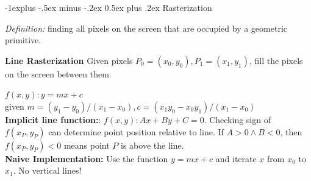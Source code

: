 \documentclass[letterpaper, 8pt]{extarticle}
\makeatletter
\renewcommand{\section}{\@startsection{section}{1}{0mm}%
                                {-1explus -.5ex minus -.2ex}%
                                {0.5ex plus .2ex}%
                                {\normalfont\small\bfseries}}
\makeatother
\begin{document}
\begin{multicols*}{4}
\section{Rasterization}

\textit{Definition:} finding all pixels on the screen that are occupied by a geometric primitive.

\textbf{Line Rasterization}
Given pixels $P_0 = (x_0, y_0), P_1 = (x_1, y_1)$, fill the pixels on the screen between them.

$f(x, y): y = mx + c$\\given $m=(y_1 - y_0)/(x_1 - x_0), c=(x_1y_0 - x_0y_1)/(x_1 - x_0)$\\
\textbf{Implicit line function:}: $f(x,y): Ax + By + C = 0$. Checking sign of $f(x_P, y_P)$ can determine point position relative to line. If $A>0 \land B<0$, then $f(x_P, y_P) < 0$ means point $P$ is above the line.\\

\textbf{Naive Implementation:} Use the function $y=mx+c$ and iterate $x$ from $x_0$ to $x_1$. No vertical lines!\\






\end{multicols*}
\end{document}
